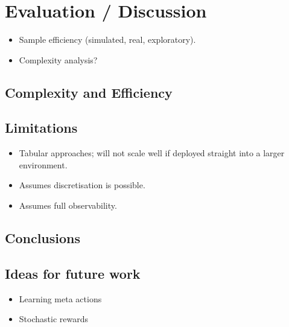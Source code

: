 \chapter{Evaluation / Discussion}
\label{chapter6}
\begin{itemize}
    \item Sample efficiency (simulated, real, exploratory).
    \item Complexity analysis?
\end{itemize}
\section{Complexity and Efficiency}
\section{Limitations}
\begin{itemize}
    \item Tabular approaches; will not scale well if deployed straight into a larger environment.
    \item Assumes discretisation is possible.
    \item Assumes full observability.
    
\end{itemize}
\section{Conclusions}

\section{Ideas for future work}
\begin{itemize}
    \item Learning meta actions
    \item Stochastic rewards
\end{itemize}
